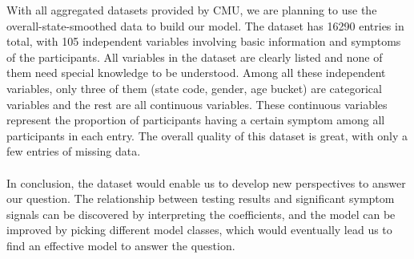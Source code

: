 \documentclass{article}
\begin{document}
With all aggregated datasets provided by CMU, we are planning to use the overall-state-smoothed data to build our model. The dataset has 16290 entries in total, with 105 independent variables involving basic information and symptoms of the participants. All variables in the dataset are clearly listed and none of them need special knowledge to be understood. Among all these independent variables, only three of them (state code, gender, age bucket) are categorical variables and the rest are all continuous variables. These continuous variables represent the proportion of participants having a certain symptom among all participants in each entry. The overall quality of this dataset is great, with only a few entries of missing data.\\
~\\

In conclusion, the dataset would enable us to develop new perspectives to answer our question. The relationship between testing results and significant symptom signals can be discovered by interpreting the coefficients, and the model can be improved by picking different model classes, which would eventually lead us to find an effective model to answer the question.
\end{document}
